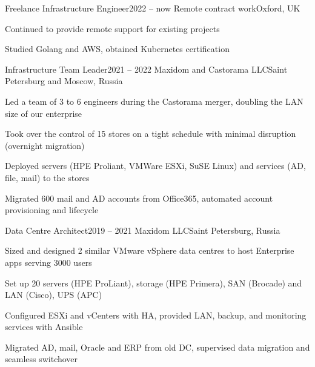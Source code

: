 

\expSubHeading
  {Freelance Infrastructure Engineer}{2022 -- now}
  {Remote contract work}{Oxford, UK}
\begin{zitemize}
\item Continued to provide remote support for existing projects
\item Studied Golang and AWS, obtained Kubernetes certification
\end{zitemize}

\expSubHeading
  {Infrastructure Team Leader}{2021 -- 2022}
  {Maxidom and Castorama LLC}{Saint Petersburg and Moscow, Russia}
\begin{zitemize}
\item Led a team of 3 to 6 engineers during the Castorama merger, doubling the LAN size of our enterprise
\item Took over the control of 15 stores on a tight schedule with minimal disruption (overnight migration)
\item Deployed servers (HPE Proliant, VMWare ESXi, SuSE Linux) and services (AD, file, mail) to the stores
\item Migrated 600 mail and AD accounts from Office365, automated account provisioning and lifecycle
\end{zitemize}

\expSubHeading
  {Data Centre Architect}{2019 -- 2021}
  {Maxidom LLC}{Saint Petersburg, Russia}
\begin{zitemize}
\item Sized and designed 2 similar VMware vSphere data centres to host Enterprise apps serving 3000 users
\item Set up 20 servers (HPE ProLiant), storage (HPE Primera), SAN (Brocade) and LAN (Cisco), UPS (APC)
\item Configured ESXi and vCenters with HA, provided LAN, backup, and monitoring services with Ansible
\item Migrated AD, mail, Oracle and ERP from old DC, supervised data migration and seamless switchover
\end{zitemize}

